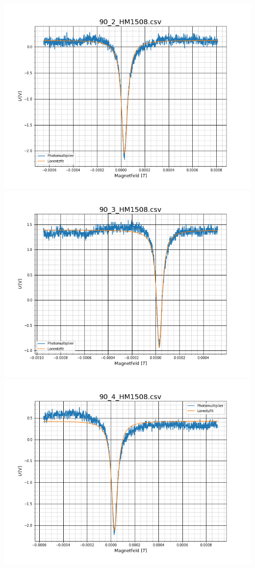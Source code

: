 \includegraphics[scale=0.3]{Bild/Anhang/Abkuhlung_1/abk_1_903}
\includegraphics[scale=0.3]{Bild/Anhang/Abkuhlung_1/abk_1_904}\\
\includegraphics[scale=0.3]{Bild/Anhang/Abkuhlung_1/abk_1_905}
